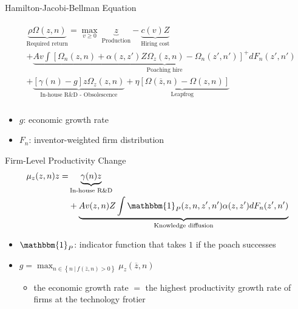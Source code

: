 \documentclass{beamer}
\begin{document}
\begin{frame}{Hamilton-Jacobi-Bellman Equation}

  \begin{align*}
    \begin{split}
      &\underbrace{\rho \Omega(z,n)}_{\text{Required return}} = \max_{v \geq 0} \ \underbrace{z}_{\text{Production}} - \underbrace{c(v)Z}_{\text{Hiring cost}} \\
      & + \underbrace{A v \int\left[\Omega_n(z,n) + \alpha(z,z')Z\Omega_z(z,n)- \Omega_n(z',n')\right]^+dF_{n}(z',n')}_{\text{Poaching hire}} \\ & + \underbrace{\left[\gamma(n) - g\right]z\Omega_z(z,n)}_{\text{In-house R\&D - Obsolescence}} + \underbrace{\eta \left[\Omega(\overline{z},n) - \Omega(z,n)\right]}_{\text{Leapfrog}}\\
    \end{split}
  \end{align*}
  \begin{itemize}
    \item $g$: economic growth rate
    \item $F_{n}$: inventor-weighted firm distribution
  \end{itemize}
\end{frame}

\begin{frame}{Firm-Level Productivity Change }
  \begin{align*}
    \mu_z(z,n)z = & \underbrace{\gamma(n)z}_{\text{In-house R\&D}} \\ &+ \underbrace{A v(z,n)Z\int\mathbbm{1}_P(z,n,z',n')\alpha(z,z')dF_{n}(z',n')}_{\text{Knowledge diffusion}}
  \end{align*}
  \begin{itemize}
    \item $\mathbbm{1}_P$: indicator function that takes $1$ if the poach successes
    \item $g = \max_{n \in \left\{n \ | \  f(\overline{z},n)>0\right\}} \mu_z(\overline{z},n)$
          \begin{itemize}
            \item the economic growth rate $=$ the highest productivity growth rate of firms at the technology frotier
          \end{itemize}
  \end{itemize}
\end{frame}
\end{document}
